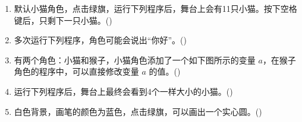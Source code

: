 \documentclass[10pt, a4paper]{article}
\newcommand{\hq}{\hfill(\qquad)}
\begin{document}
\begin{enumerate}
        \item 默认小猫角色，点击绿旗，运行下列程序后，舞台上会有11只小猫。按下空格键后，只剩下一只小猫。\hq

        \item 多次运行下列程序，角色可能会说出“你好”。\hq

        \item 有两个角色：小猫和猴子，小猫角色添加了一个如下图所示的变量 $a$，在猴子角色的程序中，可以直接修改变量 $a$ 的值。\hq

        \item 运行下列程序后，舞台上最终会看到4个一样大小的小猫。\hq

        \item 白色背景，画笔的颜色为蓝色，点击绿旗，可以画出一个实心圆。\hq
        

\end{enumerate}
\end{document}
